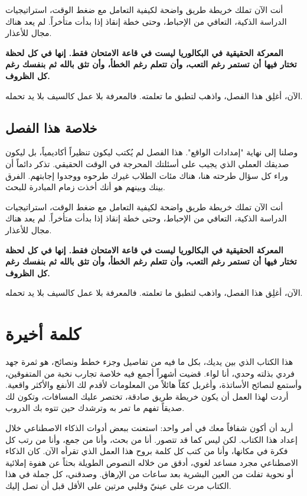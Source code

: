 \documentclass[12pt,a4paper]{book}
\newcommand{\importantAr}[1]{%
	\begin{important}
		\bfseries #1
	\end{important}
}
\begin{document}
	أنت الآن تملك خريطة طريق واضحة لكيفية التعامل مع ضغط الوقت، استراتيجيات الدراسة الذكية، التعافي من الإحباط، وحتى خطة إنقاذ إذا بدأت متأخراً. لم يعد هناك مجال للأعذار.
	
	\importantAr{المعركة الحقيقية في البكالوريا ليست في قاعة الامتحان فقط. إنها في كل لحظة تختار فيها أن تستمر رغم التعب، وأن تتعلم رغم الخطأ، وأن تثق بالله ثم بنفسك رغم كل الظروف.}
	
	الآن، أغلِق هذا الفصل، واذهب لتطبق ما تعلمته. فالمعرفة بلا عمل كالسيف بلا يد تحمله.
	
\section{خلاصة هذا الفصل}

وصلنا إلى نهاية "إمدادات الواقع". هذا الفصل لم يُكتب ليكون تنظيراً أكاديمياً، بل ليكون صديقك العملي الذي يجيب على أسئلتك المحرجة في الوقت الحقيقي. تذكر دائماً أن وراء كل سؤال طرحته هنا، هناك مئات الطلاب غيرك طرحوه ووجدوا إجابتهم. الفرق بينك وبينهم هو أنك أخذت زمام المبادرة للبحث.

أنت الآن تملك خريطة طريق واضحة لكيفية التعامل مع ضغط الوقت، استراتيجيات الدراسة الذكية، التعافي من الإحباط، وحتى خطة إنقاذ إذا بدأت متأخراً. لم يعد هناك مجال للأعذار.

\importantAr{المعركة الحقيقية في البكالوريا ليست في قاعة الامتحان فقط. إنها في كل لحظة تختار فيها أن تستمر رغم التعب، وأن تتعلم رغم الخطأ، وأن تثق بالله ثم بنفسك رغم كل الظروف.}

الآن، أغلِق هذا الفصل، واذهب لتطبق ما تعلمته. فالمعرفة بلا عمل كالسيف بلا يد تحمله.


\chapter*{كلمة أخيرة}

هذا الكتاب الذي بين يديك، بكل ما فيه من تفاصيل وجزء خطط ونصائح، هو ثمرة جهد فردي بذلته وحدي، أنا لواء. قضيت أشهراً أجمع فيه خلاصة تجارب نخبة من المتفوقين، وأستمع لنصائح الأساتذة، وأغربل كمّاً هائلاً من المعلومات لأقدم لك الأنفع والأكثر واقعية. أردت لهذا العمل أن يكون خريطة طريق صادقة، تختصر عليك المسافات، وتكون لك صديقاً تفهم ما تمر به وترشدك حين تتوه بك الدروب.

أريد أن أكون شفافاً معك في أمر واحد: استعنت ببعض أدوات الذكاء الاصطناعي خلال إعداد هذا الكتاب. لكن ليس كما قد تتصور. أنا من بحث، وأنا من جمع، وأنا من رتب كل فكرة في مكانها، وأنا من كتب كل كلمة بروح هذا العمل الذي تقرأه الآن. كان الذكاء الاصطناعي مجرد مساعد لغوي، أدقق من خلاله النصوص الطويلة بحثاً عن هفوة إملائية أو نحوية تفلت من العين البشرية بعد ساعات من الإرهاق. وصدقني، كل جملة في هذا الكتاب مرت على عينيّ وقلبي مرتين على الأقل قبل أن تصل إليك.
\end{document}
